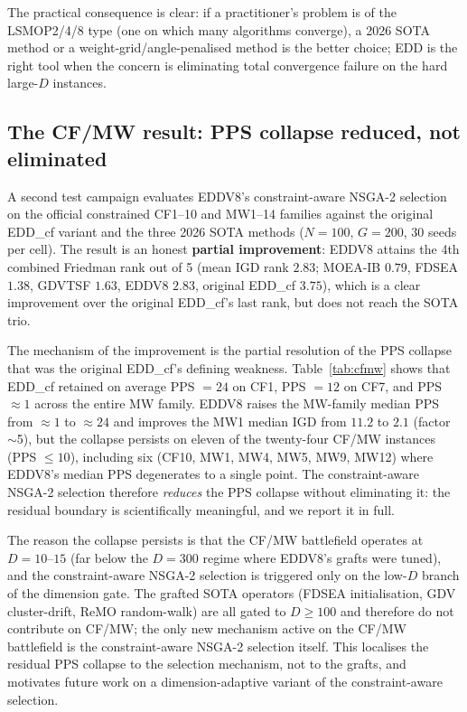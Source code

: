 \documentclass[preprint,12pt]{elsarticle}
\begin{document}
The practical consequence is clear: if a practitioner's problem is of the
LSMOP2/4/8 type (one on which many algorithms converge), a 2026 SOTA method
or a weight-grid/angle-penalised method is the better choice; EDD is the
right tool when the concern is eliminating total convergence failure on the
hard large-$D$ instances.

\subsection{The CF/MW result: PPS collapse reduced, not eliminated}
\label{sec:cfmw}

A second test campaign evaluates EDDV8's constraint-aware NSGA-2
selection on the official constrained CF1--10 and MW1--14 families
against the original EDD\_cf variant and the three 2026 SOTA methods
($N=100$, $G=200$, 30 seeds per cell). The result is an honest
\textbf{partial improvement}: EDDV8 attains the 4th combined Friedman
rank out of 5 (mean IGD rank $2.83$; MOEA-IB $0.79$, FDSEA $1.38$,
GDVTSF $1.63$, EDDV8 $2.83$, original EDD\_cf $3.75$), which is a
clear improvement over the original EDD\_cf's last rank, but does not
reach the SOTA trio.

The mechanism of the improvement is the partial resolution of the PPS
collapse that was the original EDD\_cf's defining weakness.
Table~\ref{tab:cfmw} shows that EDD\_cf retained on average PPS $= 24$
on CF1, PPS $= 12$ on CF7, and PPS $\approx 1$ across the entire MW
family. EDDV8 raises the MW-family median PPS from $\approx 1$ to
$\approx 24$ and improves the MW1 median IGD from $11.2$ to $2.1$
(factor $\sim$5), but the collapse persists on eleven of the
twenty-four CF/MW instances (PPS $\le 10$), including six (CF10, MW1,
MW4, MW5, MW9, MW12) where EDDV8's median PPS degenerates to a single
point. The constraint-aware NSGA-2 selection therefore \emph{reduces}
the PPS collapse without eliminating it: the residual boundary is
scientifically meaningful, and we report it in full.

The reason the collapse persists is that the CF/MW battlefield
operates at $D = 10$--$15$ (far below the $D = 300$ regime where
EDDV8's grafts were tuned), and the constraint-aware NSGA-2 selection
is triggered only on the low-$D$ branch of the dimension gate. The
grafted SOTA operators (FDSEA initialisation, GDV cluster-drift, ReMO
random-walk) are all gated to $D \ge 100$ and therefore do not
contribute on CF/MW; the only new mechanism active on the CF/MW
battlefield is the constraint-aware NSGA-2 selection itself. This
localises the residual PPS collapse to the selection mechanism, not
to the grafts, and motivates future work on a dimension-adaptive
variant of the constraint-aware selection.
\end{document}
